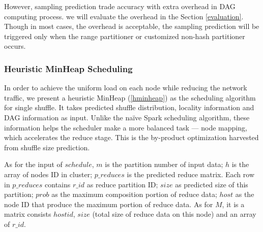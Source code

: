 However, sampling prediction trade accuracy with extra overhead in DAG computing process. we will evaluate the overhead in the Section \ref{evaluation}. Though in most cases, the overhead is acceptable, the sampling prediction will be triggered only when the range partitioner or customized non-hash partitioner occurs.

\subsubsection{Heuristic MinHeap Scheduling}\label{h-minheap}
In order to achieve the uniform load on each node while reducing the network traffic, we present a heuristic MinHeap (\ref{hminheap}) as the scheduling algorithm for single shuffle. It takes predicted shuffle distribution, locality information and DAG information as input. Unlike the na\"{i}ve Spark scheduling algorithm, these information helps the scheduler make a more balanced task --- node mapping, which accelerates the reduce stage. This is the by-product optimization harvested from shuffle size prediction.

As for the input of $schedule$, $m$ is the partition number of input data; $h$ is the array of nodes ID in cluster; $p\_reduces$ is the predicted reduce matrix. Each row in $p\_reduces$ contains $r\_id$ as reduce partition ID; $size$ as predicted size of this partition; $prob$ as the maximum composition portion of reduce data; $host$ as the node ID that produce the maximum portion of reduce data. As for $M$, it is a matrix consists $hostid$, $size$ (total size of reduce data on this node) and an array of $r\_id$.

